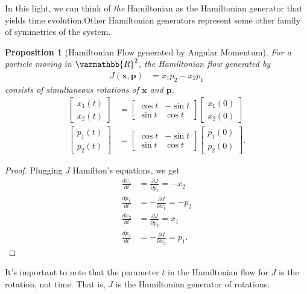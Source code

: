 \documentclass[12pt]{extarticle}
\newcommand{\R}{\varmathbb{R}}
\theoremstyle{plain}
\newtheorem*{proposition}{Proposition}%
\theoremstyle{definition}
\theoremstyle{remark}
\renewcommand{\newline}{\hfill\break}
\begin{document}
  In this light, we can think of \textit{the} Hamiltonian as the Hamiltonian generator that yields time evolution.Other Hamiltonian generators represent some other family of symmetries of the system.
  \begin{proposition}[Hamiltonian Flow generated by Angular Momentum]
    For a particle moving in $\R^2$, the Hamiltonian  flow generated by 
    \begin{align*}
      J(\mathbf{x},\mathbf{p}) &= x_1p_2 - x_2p_1
    \end{align*}
    consists of simultaneous rotations of $\mathbf{x}$ and $\mathbf{p}$.
    \begin{align*}
      \begin{bmatrix}x_1(t)\\x_2(t)\end{bmatrix} &= \begin{bmatrix}\cos t & -\sin t\\\sin t& \cos t\end{bmatrix} \begin{bmatrix}x_1(0)\\x_2(0)\end{bmatrix}\\
      \begin{bmatrix}p_1(t)\\p_2(t)\end{bmatrix} &= \begin{bmatrix}\cos t & -\sin t \\ \sin t & \cos t\end{bmatrix} \begin{bmatrix}p_1(0) \\ p_2(0)\end{bmatrix}.
    \end{align*}
  \end{proposition}
  \begin{proof}
    Plugging $J$ Hamilton's equations, we get
        \begin{align*}
          \frac{dx_1}{dt} &= \frac{\partial J}{\partial p_1} = -x_2\\
          \frac{dp_1}{dt} &= -\frac{\partial J}{\partial x_1} = -p_2\\
          \frac{dx_2}{dt} &= \frac{\partial J}{\partial p_2} = x_1\\
          \frac{dp_2}{dt} &= -\frac{\partial J}{\partial x_2} = p_1.
        \end{align*}
  \end{proof}
  It's important to note that the parameter $t$ in the Hamiltonian flow for $J$ is the rotation, not time. That is, $J$ is the Hamiltonian generator of rotations.\newline
\end{document}
